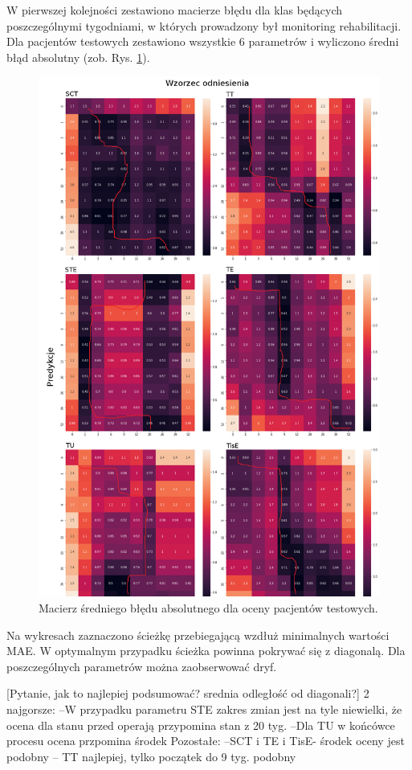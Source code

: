 W pierwszej kolejności zestawiono macierze błędu dla klas będących poszczególnymi tygodniami, w których prowadzony był monitoring rehabilitacji. Dla pacjentów testowych zestawiono wszystkie 6 parametrów i wyliczono średni błąd absolutny (zob. Rys. \ref{fig:CM_MAE}). 
\begin{figure}[t!]
	\centering
	\includegraphics[width=1\textwidth]{figures/cm.png}
	\caption{Macierz średniego błędu absolutnego dla oceny pacjentów testowych.}\label{fig:CM_MAE}
\end{figure}
Na wykresach zaznaczono ścieżkę przebiegającą wzdłuż minimalnych wartości MAE. W optymalnym przypadku ścieżka powinna pokrywać się z diagonalą. Dla poszczególnych parametrów można zaobserwować dryf. 

[Pytanie, jak to najlepiej podsumować? srednia odległość od diagonali?]
2 najgorsze:
--W przypadku parametru STE zakres zmian jest na tyle niewielki, że ocena dla stanu przed operają przypomina stan z 20 tyg. 
--Dla TU w końcówce procesu ocena przpomina środek
Pozostałe:
--SCT i TE i TisE- środek oceny jest podobny
-- TT najlepiej, tylko początek do 9 tyg. podobny

